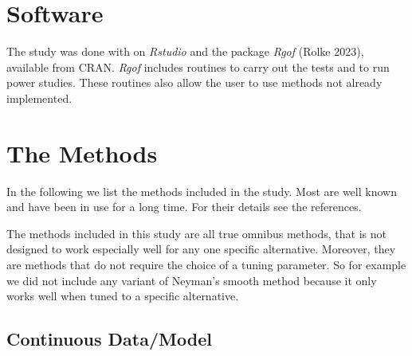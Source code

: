 \documentclass[]{svjour3}
\begin{document}
\section{Software}

The study was done with  \citet{r2021} on \emph{Rstudio}
\citet{rstudio2020} and the package \emph{Rgof} (Rolke 2023), available from CRAN.  \emph{Rgof} includes routines to carry out the tests and to run power studies. These routines also allow the user to use methods not already implemented. 

\section{The Methods}\label{the-methods}
In the following we list the methods included in the study. Most
are well known and have been in use for a long time. For their details
see the references.

The methods included in this study are all true omnibus methods, that is not designed to work especially well for any one specific alternative. Moreover, they are methods that do not require the choice of a tuning parameter. So for example we did not include any variant of Neyman's smooth method \citet{neyman1937} because it only works well when tuned to a specific alternative.

\subsection{Continuous Data/Model}
\end{document}
